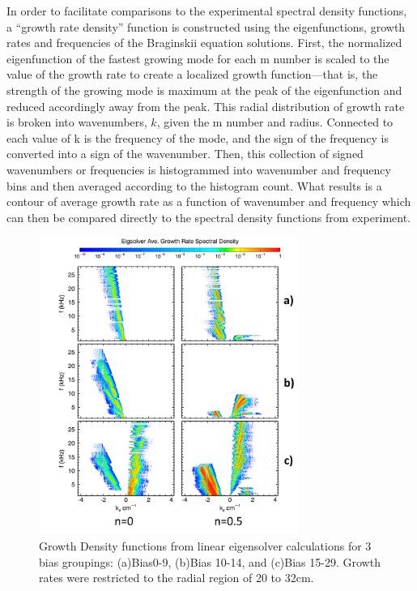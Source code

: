 \documentclass[aip,pop,amsmath,amssymb,reprint,superscriptaddress]{revtex4-1} %
\begin{document}
In order to facilitate comparisons to the experimental spectral density functions, a ``growth rate density'' function is constructed using the eigenfunctions, growth rates and frequencies of the Braginskii equation solutions. First, the normalized eigenfunction of the fastest growing mode for each m number is scaled to the value of the growth rate to create a localized growth function---that is, the strength of the growing mode is maximum at the peak of the eigenfunction and reduced accordingly away from the peak. This radial distribution of growth rate is broken into wavenumbers, $k$, given the m number and radius. Connected to each value of k is the frequency of the mode, and the sign of the frequency is converted into a sign of the wavenumber. Then, this collection of signed wavenumbers or frequencies is histogrammed into wavenumber and frequency bins and then averaged according to the histogram count. What results is a contour of average growth rate as a function of wavenumber and frequency which can then be compared directly to the spectral density functions from experiment.

\begin{figure}[!htbp]
\centerline{
\includegraphics[width=8.5cm]{growth_density_20to32_lab}}%
\caption{\label{fig:growth_density_20to32} Growth Density functions from linear eigensolver calculations for 3 bias groupings: (a)Bias0-9, (b)Bias 10-14, and (c)Bias 15-29. Growth rates were restricted to the radial region of 20 to 32cm.}
\end{figure}
\end{document}
